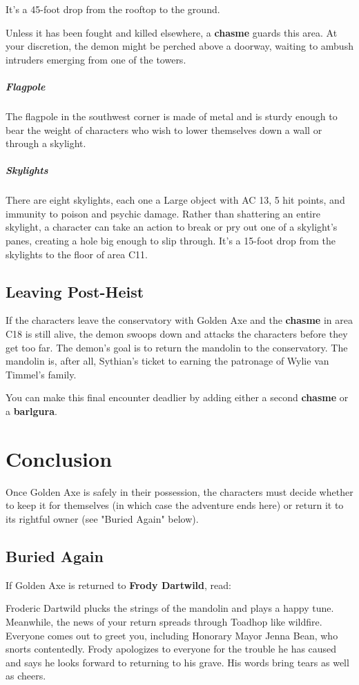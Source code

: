 \documentclass[10pt,a4paper,twoside,bg=print,twocolumn,openany,nodeprecatedcode]{dndbook}
\begin{document}
It's a 45-foot drop from the rooftop to the ground.

Unless it has been fought and killed elsewhere, a \textbf{chasme} guards this area. At your discretion, the demon might be perched above a doorway, waiting to ambush intruders emerging from one of the towers.

\subparagraph{Flagpole}
The flagpole in the southwest corner is made of metal and is sturdy enough to bear the weight of characters who wish to lower themselves down a wall or through a skylight.

\subparagraph{Skylights}
There are eight skylights, each one a Large object with AC 13, 5 hit points, and immunity to poison and psychic damage. Rather than shattering an entire skylight, a character can take an action to break or pry out one of a skylight's panes, creating a hole big enough to slip through. It's a 15-foot drop from the skylights to the floor of area C11.

\subsection{Leaving Post-Heist}
If the characters leave the conservatory with Golden Axe and the \textbf{chasme} in area C18 is still alive, the demon swoops down and attacks the characters before they get too far. The demon's goal is to return the mandolin to the conservatory. The mandolin is, after all, Sythian's ticket to earning the patronage of Wylie van Timmel's family.

You can make this final encounter deadlier by adding either a second \textbf{chasme} or a \textbf{barlgura}.

\section{Conclusion}
Once Golden Axe is safely in their possession, the characters must decide whether to keep it for themselves (in which case the adventure ends here) or return it to its rightful owner (see "Buried Again" below).

\subsection{Buried Again}
If Golden Axe is returned to \textbf{Frody Dartwild}, read:

\begin{DndReadAloud}{}
Froderic Dartwild plucks the strings of the mandolin and plays a happy tune. Meanwhile, the news of your return spreads through Toadhop like wildfire. Everyone comes out to greet you, including Honorary Mayor Jenna Bean, who snorts contentedly. Frody apologizes to everyone for the trouble he has caused and says he looks forward to returning to his grave. His words bring tears as well as cheers.

\end{DndReadAloud}
\end{document}
